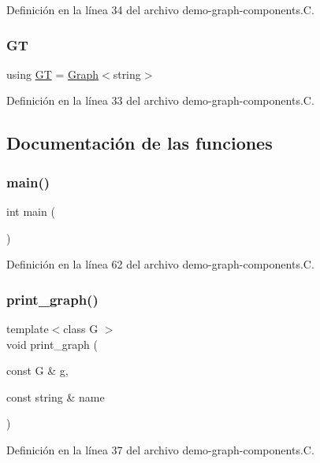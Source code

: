 Definición en la línea 34 del archivo demo-\/graph-\/components.\+C.

\mbox{\label{demo-graph-components_8_c_a668102de43ec3f9488fff7b515d48859}} 
\subsubsection{\texorpdfstring{GT}{GT}}
{\footnotesize\ttfamily using \hyperlink{demo-buildgraph_8_c_a3001c40d2c31ca87ed96cd7d1334a55e}{GT} =  \hyperlink{class_designar_1_1_graph}{Graph}$<$string$>$}



Definición en la línea 33 del archivo demo-\/graph-\/components.\+C.



\subsection{Documentación de las funciones}
\mbox{\label{demo-graph-components_8_c_ae66f6b31b5ad750f1fe042a706a4e3d4}} 
\subsubsection{\texorpdfstring{main()}{main()}}
{\footnotesize\ttfamily int main (\begin{DoxyParamCaption}{ }\end{DoxyParamCaption})}



Definición en la línea 62 del archivo demo-\/graph-\/components.\+C.

\mbox{\label{demo-graph-components_8_c_af4aa6ad85cbef3cd03726e2b31004df6}} 
\subsubsection{\texorpdfstring{print\+\_\+graph()}{print\_graph()}}
{\footnotesize\ttfamily template$<$class G $>$ \\
void print\+\_\+graph (\begin{DoxyParamCaption}\item[{const G \&}]{g,  }\item[{const string \&}]{name }\end{DoxyParamCaption})}



Definición en la línea 37 del archivo demo-\/graph-\/components.\+C.

